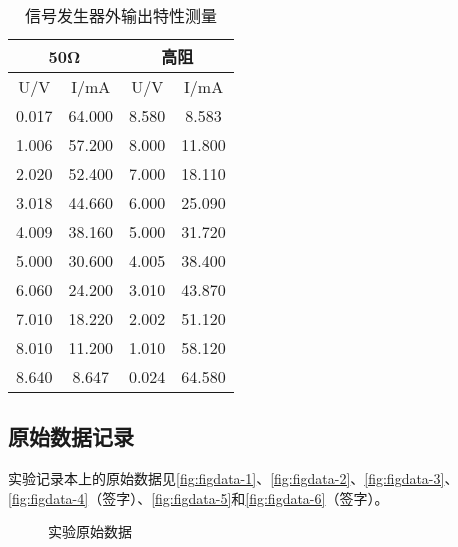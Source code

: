 \documentclass[dvipsnames, svgnames,a4paper,11pt]{article}
\begin{document}
\begin{enumerate}
			\begin{table}[htbp]
				\centering
				\caption{信号发生器外输出特性测量}
				\begin{tabular}{|c|c|c|c|}
					\hline
					\multicolumn{2}{|c|}{50Ω} & \multicolumn{2}{c|}{高阻} \\
					\hline
					U/V & I/mA & U/V & I/mA \\
					\hline
					0.017 & 64.000 & 8.580 & 8.583 \\
					1.006 & 57.200 & 8.000 & 11.800 \\
					2.020 & 52.400 & 7.000 & 18.110 \\
					3.018 & 44.660 & 6.000 & 25.090 \\
					4.009 & 38.160 & 5.000 & 31.720 \\
					5.000 & 30.600 & 4.005 & 38.400 \\
					6.060 & 24.200 & 3.010 & 43.870 \\
					7.010 & 18.220 & 2.002 & 51.120 \\
					8.010 & 11.200 & 1.010 & 58.120 \\
					8.640 & 8.647 & 0.024 & 64.580 \\
					\hline
				\end{tabular}%
				\label{tab:tab2}%
			\end{table}%
	\end{enumerate}
	
	
	\subsection{原始数据记录}
	实验记录本上的原始数据见\cref{fig:figdata-1}、\cref{fig:figdata-2}、\cref{fig:figdata-3}、\cref{fig:figdata-4}（签字）、\cref{fig:figdata-5}和\cref{fig:figdata-6}（签字）。

	\begin{figure}[htbp]
		\centering
		\quad
		\quad
		\quad
		\quad
		\quad
		\quad
		\caption{实验原始数据}
		\label{fig:graph10}
	\end{figure}
	
\end{document}
